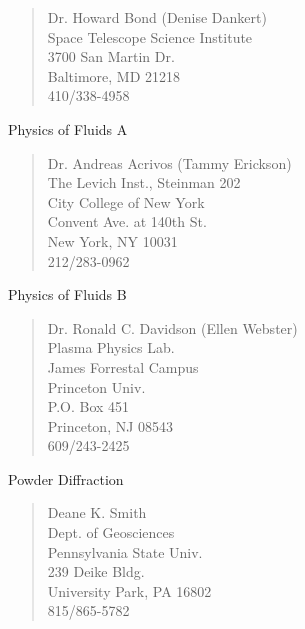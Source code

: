 \begin{verse}
             Dr. Howard Bond (Denise Dankert)\\
             Space Telescope Science Institute\\
             3700 San Martin Dr.\\
             Baltimore, MD  21218\\
             410/338-4958\\
\end{verse}

\noindent      Physics of Fluids A

\begin{verse}
             Dr. Andreas Acrivos (Tammy Erickson)\\
             The Levich Inst., Steinman 202\\
             City College of New York\\
             Convent Ave. at 140th St.\\
             New York, NY  10031\\
             212/283-0962\\
\end{verse}

\noindent      Physics of Fluids B

\begin{verse}
             Dr. Ronald C. Davidson (Ellen Webster)\\
             Plasma Physics Lab.\\
             James Forrestal Campus\\
             Princeton Univ.\\
             P.O. Box 451\\
             Princeton, NJ  08543\\
             609/243-2425\\
\end{verse}

\noindent      Powder Diffraction

\begin{verse}
             Deane K. Smith\\
             Dept. of Geosciences\\
             Pennsylvania State Univ.\\
             239 Deike Bldg.\\
             University Park, PA  16802\\
             815/865-5782
\end{verse}

